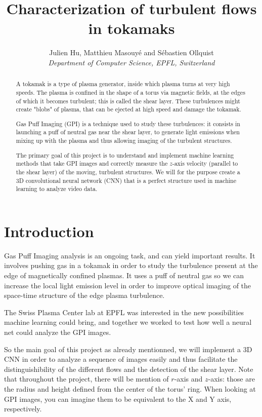 \documentclass[10pt,conference]{IEEEtran}
\begin{document}
\title{Characterization of turbulent flows in tokamaks}

\author{
  Julien Hu, Matthieu Masouyé and Sébastien Ollquist\\
  \textit{Department of Computer Science, EPFL, Switzerland}
}

\maketitle

\begin{abstract}
  A tokamak is a type of plasma generator, inside which plasma turns at very high speeds. The plasma is confined in the shape of a torus via magnetic fields, at the edges of which it becomes turbulent; this is called the shear layer. These turbulences might create "blobs" of plasma, that can be ejected at high speed and damage the tokamak.\par
  Gas Puff Imaging (GPI) is a technique used to study these turbulences: it consists in launching a puff of neutral gas near the shear layer, to generate light emissions when mixing up with the plasma and thus allowing imaging of the turbulent structures.\par
  The primary goal of this project is to understand and implement machine learning methods that take GPI images and correctly measure the $z$-axis velocity (parallel to the shear layer) of the moving, turbulent structures. We will for the purpose create a 3D convolutional neural network (CNN) that is a perfect structure used in machine learning to analyze video data.
\end{abstract}

\section{Introduction}
Gas Puff Imaging analysis is an ongoing task, and can yield important results. It involves pushing gas in a tokamak in order to study the turbulence present at the edge of magnetically confined plasmas. It uses a puff of neutral gas so we can increase the local light emission level in order to improve optical imaging of the space-time structure of the edge plasma turbulence.\par
The Swiss Plasma Center lab at EPFL was interested in the new possibilities machine learning could bring, and together we worked to test how well a neural net could analyze the GPI images.\par
So the main goal of this project as already mentionned, we will implement a 3D CNN in order to analyze a sequence of images easily and thus facilitate the distinguishibility of the different flows and the detection of the shear layer. Note that throughout the project, there will be mention of $r$-axis and $z$-axis: those are the radius and height defined from the center of the torus' ring. When looking at GPI images, you can imagine them to be equivalent to the X and Y axis, respectively.
\end{document}
